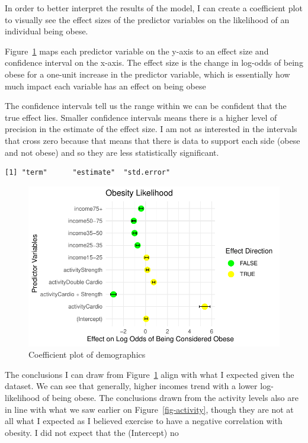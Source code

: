 \documentclass[
  letterpaper,
  DIV=11,
  numbers=noendperiod]{scrartcl}
\begin{document}
In order to better interpret the results of the model, I can create a
coefficient plot to visually see the effect sizes of the predictor
variables on the likelihood of an individual being obese.

Figure~\ref{fig-coefficient} maps each predictor variable on the y-axis
to an effect size and confidence interval on the x-axis. The effect size
is the change in log-odds of being obese for a one-unit increase in the
predictor variable, which is essentially how much impact each variable
has an effect on being obese

The confidence intervals tell us the range within we can be confident
that the true effect lies. Smaller confidence intervals means there is a
higher level of precision in the estimate of the effect size. I am not
as interested in the intervals that cross zero because that means that
there is data to support each side (obese and not obese) and so they are
less statistically significant.

\begin{verbatim}
[1] "term"      "estimate"  "std.error"
\end{verbatim}

\begin{figure}

{\centering \includegraphics{paper_files/figure-pdf/fig-coefficient-1.pdf}

}

\caption{\label{fig-coefficient}Coefficient plot of demographics}

\end{figure}

The conclusions I can draw from Figure~\ref{fig-coefficient} align with
what I expected given the dataset. We can see that generally, higher
incomes trend with a lower log-likelihood of being obese. The
conclusions drawn from the activity levels also are in line with what we
saw earlier on Figure~\ref{fig-activity}, though they are not at all
what I expected as I believed exercise to have a negative correlation
with obesity. I did not expect that the (Intercept) no
\end{document}
